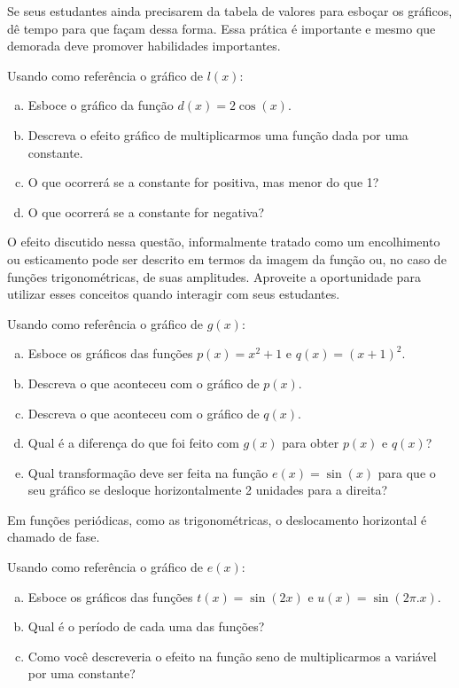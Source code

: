 \documentclass[main_estudante.tex]{subfiles}
\begin{document}
Se seus estudantes ainda precisarem da tabela de valores para esboçar os gráficos, dê tempo para que façam dessa forma. Essa prática é importante e mesmo que demorada deve promover habilidades importantes.

\begin{questao}
Usando como referência o gráfico de $l(x)$:
\begin{enumerate}[a)]
\item Esboce o gráfico da função $d(x)=2\cos(x)$.
\item Descreva o efeito gráfico de multiplicarmos uma função dada por uma constante.
\item O que ocorrerá se a constante for positiva, mas menor do que 1?
\item O que ocorrerá se a constante for negativa?
\end{enumerate}
\end{questao}

O efeito discutido nessa questão, informalmente tratado como um encolhimento ou esticamento pode ser descrito em termos da imagem da função ou, no caso de funções trigonométricas, de suas amplitudes. Aproveite a oportunidade para utilizar esses conceitos quando interagir com seus estudantes.

\begin{questao}
Usando como referência o gráfico de  $g(x)$:
\begin{enumerate}[a)]
\item Esboce os gráficos das funções $p(x)=x^2+1$ e $q(x)=(x+1)^2$.
\item Descreva o que aconteceu com o gráfico de $p(x)$.
\item Descreva o que aconteceu com o gráfico de $q(x)$.
\item Qual é a diferença do que foi feito com $g(x)$ para obter $p(x)$ e $q(x)$?
\item Qual transformação deve ser feita na função $e(x)=\sin(x)$ para que o seu gráfico se desloque horizontalmente 2 unidades para a direita?
\end{enumerate}
\end{questao}

Em funções periódicas, como as trigonométricas, o deslocamento horizontal é chamado de fase.

\begin{questao}
Usando como referência o gráfico de $e(x)$:
\begin{enumerate}[a)]
\item Esboce os gráficos das funções $t(x)=\sin(2x)$ e $u(x)=\sin(2\pi.x)$.
\item Qual é o período de cada uma das funções?
\item Como você descreveria o efeito na função seno de multiplicarmos a variável por uma constante?
\end{enumerate}
\end{questao}
\end{document}
